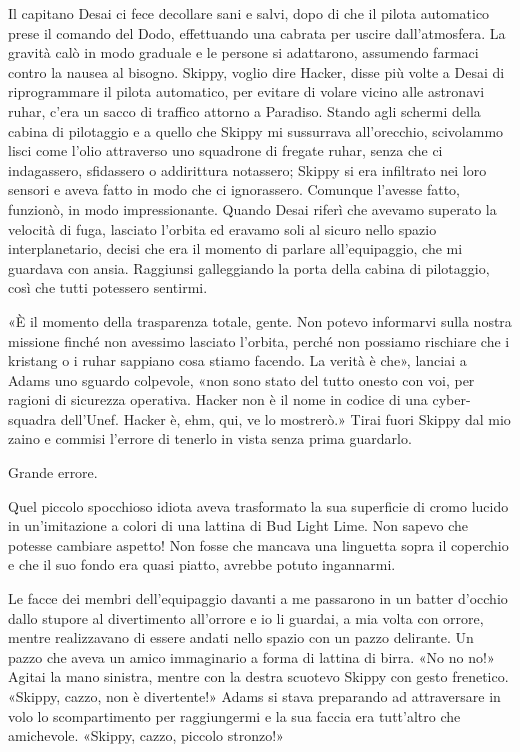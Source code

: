 Il capitano Desai ci fece decollare sani e salvi, dopo di che il pilota
automatico prese il comando del Dodo, effettuando una cabrata per uscire
dall'atmosfera. La gravità calò in modo graduale e le persone si
adattarono, assumendo farmaci contro la nausea al bisogno. Skippy,
voglio dire Hacker, disse più volte a Desai di riprogrammare il pilota
automatico, per evitare di volare vicino alle astronavi ruhar, c'era un
sacco di traffico attorno a Paradiso. Stando agli schermi della cabina
di pilotaggio e a quello che Skippy mi sussurrava all'orecchio,
scivolammo lisci come l'olio attraverso uno squadrone di fregate ruhar,
senza che ci indagassero, sfidassero o addirittura notassero; Skippy si
era infiltrato nei loro sensori e aveva fatto in modo che ci
ignorassero. Comunque l'avesse fatto, funzionò, in modo impressionante.
Quando Desai riferì che avevamo superato la velocità di fuga, lasciato
l'orbita ed eravamo soli al sicuro nello spazio interplanetario, decisi
che era il momento di parlare all'equipaggio, che mi guardava con ansia.
Raggiunsi galleggiando la porta della cabina di pilotaggio, così che
tutti potessero sentirmi.

«È il momento della trasparenza totale, gente. Non potevo informarvi
sulla nostra missione finché non avessimo lasciato l'orbita, perché non
possiamo rischiare che i kristang o i ruhar sappiano cosa stiamo
facendo. La verità è che», lanciai a Adams uno sguardo colpevole, «non
sono stato del tutto onesto con voi, per ragioni di sicurezza operativa.
Hacker non è il nome in codice di una cyber-squadra dell'Unef. Hacker è,
ehm, qui, ve lo mostrerò.» Tirai fuori Skippy dal mio zaino e commisi
l'errore di tenerlo in vista senza prima guardarlo.

Grande errore.

Quel piccolo spocchioso idiota aveva trasformato la sua superficie di
cromo lucido in un'imitazione a colori di una lattina di Bud Light Lime.
Non sapevo che potesse cambiare aspetto! Non fosse che mancava una
linguetta sopra il coperchio e che il suo fondo era quasi piatto,
avrebbe potuto ingannarmi.

Le facce dei membri dell'equipaggio davanti a me passarono in un batter
d'occhio dallo stupore al divertimento all'orrore e io li guardai, a mia
volta con orrore, mentre realizzavano di essere andati nello spazio con
un pazzo delirante. Un pazzo che aveva un amico immaginario a forma di
lattina di birra. «No no no!» Agitai la mano sinistra, mentre con la
destra scuotevo Skippy con gesto frenetico. «Skippy, cazzo, non è
divertente!» Adams si stava preparando ad attraversare in volo lo
scompartimento per raggiungermi e la sua faccia era tutt'altro che
amichevole. «Skippy, cazzo, piccolo stronzo!»

